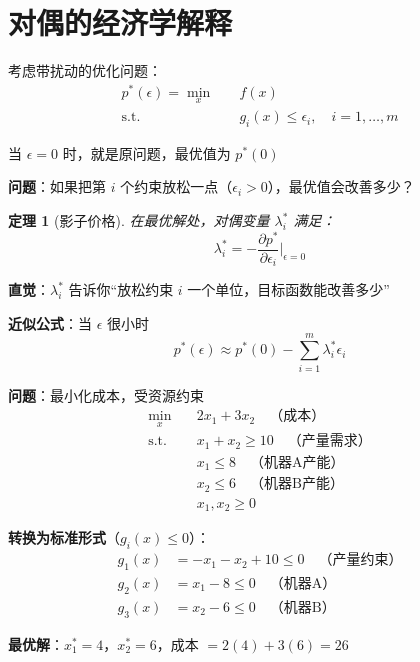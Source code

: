\documentclass[12pt, a4paper]{ctexart}
\newtheorem{theorem}{定理}[section]
\begin{document}
\section{对偶的经济学解释}

\begin{blackboard}

考虑带扰动的优化问题：
\[
\begin{aligned}
p^*(\epsilon) = \min_x \quad & f(x) \\
\text{s.t.} \quad & g_i(x) \leq \epsilon_i, \quad i = 1, \ldots, m
\end{aligned}
\]

当 $\epsilon = 0$ 时，就是原问题，最优值为 $p^*(0)$

\textbf{问题}：如果把第 $i$ 个约束放松一点（$\epsilon_i > 0$），最优值会改善多少？

\end{blackboard}

\begin{blackboard}[影子价格定理]

\begin{theorem}[影子价格]
在最优解处，对偶变量 $\lambda_i^*$ 满足：
\[
\lambda_i^* = -\frac{\partial p^*}{\partial \epsilon_i} \bigg|_{\epsilon = 0}
\]
\end{theorem}

\textbf{直觉}：$\lambda_i^*$ 告诉你``放松约束 $i$ 一个单位，目标函数能改善多少''

\textbf{近似公式}：当 $\epsilon$ 很小时
\[
p^*(\epsilon) \approx p^*(0) - \sum_{i=1}^m \lambda_i^* \epsilon_i
\]

\end{blackboard}

\begin{blackboard}

\textbf{问题}：最小化成本，受资源约束
\[
\begin{aligned}
\min_x \quad & 2x_1 + 3x_2 \quad \text{（成本）} \\
\text{s.t.} \quad & x_1 + x_2 \geq 10 \quad \text{（产量需求）} \\
& x_1 \leq 8 \quad \text{（机器A产能）} \\
& x_2 \leq 6 \quad \text{（机器B产能）} \\
& x_1, x_2 \geq 0
\end{aligned}
\]

\textbf{转换为标准形式}（$g_i(x) \leq 0$）：
\begin{align*}
g_1(x) &= -x_1 - x_2 + 10 \leq 0 \quad \text{（产量约束）} \\
g_2(x) &= x_1 - 8 \leq 0 \quad \text{（机器A）} \\
g_3(x) &= x_2 - 6 \leq 0 \quad \text{（机器B）}
\end{align*}

\textbf{最优解}：$x_1^* = 4$，$x_2^* = 6$，成本 $= 2(4) + 3(6) = 26$

\end{blackboard}
\end{document}
